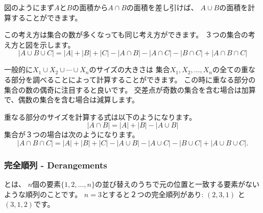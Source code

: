 図のようにまず$A$と$B$の面積から$A \cap B$の面積を差し引けば、
$A \cup B$の面積を計算することができます。

この考え方は集合の数が多くなっても同じ考え方ができます。
３つの集合の考え方と図を示します。
\[ |A \cup B \cup C| = |A| + |B| + |C| - |A \cap B|  - |A \cap C|  - |B \cap C| + |A \cap B \cap C| \]

\begin{center}
\end{center}

一般的に$X_1 \cup X_2 \cup \cdots \cup X_n$のサイズの大きさは
集合$X_1,X_2,\ldots,X_n$の全ての重なる部分を調べることによって計算することができます。
この時に重なる部分の集合の数の偶奇に注目すると良いです。
交差点が奇数の集合を含む場合は加算で、偶数の集合を含む場合は減算します。

重なる部分のサイズを計算する式は以下のようになります。
\[ |A \cap B| = |A| + |B| - |A \cup B|\]
集合が３つの場合は次のようになります。
\[ |A \cap B \cap C| = |A| + |B| + |C| - |A \cup B|  - |A \cup C|  - |B \cup C| + |A \cup B \cup C| .\]

\subsubsection{完全順列 - Derangements}


とは、
$n$個の要素$\{1,2,\ldots,n\}$の並び替えのうちで元の位置と一致する要素がないような順列のことです。
$n=3$とすると２つの完全順列があり: $(2,3,1)$ と $(3,1,2)$です。

